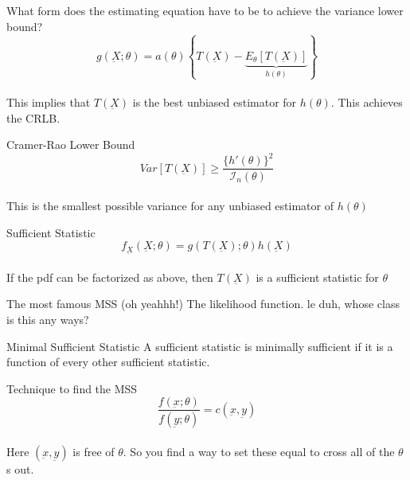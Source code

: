 \documentclass[avery5388,grid,frame]{flashcards}
\begin{document}
\begin{flashcard}[Definition]{What form does the estimating equation have to be to achieve the variance lower bound?}
\bigskip\bigskip\bigskip
\begin{equation*}
g(\underbar{X};\theta)=a(\theta)\left\{T(\underbar{X})-\underbrace{E_\theta[T(\underbar{X})]}_{h(\theta)}\right\}
\end{equation*}
\bigskip\\
This implies that $T(\underbar{X})$ is the best unbiased estimator for $h(\theta)$. This achieves the CRLB.
\end{flashcard}
\begin{flashcard}[Definition]{Cramer-Rao Lower Bound}
\bigskip\bigskip\bigskip
\begin{equation*}
Var[T(\underbar{X})]\geq\frac{\{h'(\theta)\}^2}{\mathcal{I}_n(\theta)}
\end{equation*}
\bigskip\\
This is the smallest possible variance for any unbiased estimator of $h(\theta)$
\end{flashcard}
\begin{flashcard}[Definition]{Sufficient Statistic}
\bigskip\bigskip\bigskip
\begin{equation*}
f_{\underbar{X}}(\underbar{X};\theta)=g(T(\underbar{X});\theta)h(\underbar{X})
\end{equation*}
\bigskip\\
If the pdf can be factorized as above, then $T(\underbar{X})$ is a sufficient statistic for $\theta$
\end{flashcard}
\begin{flashcard}{The most famous MSS (oh yeahhh!)}
\bigskip\bigskip\bigskip
The likelihood function. le duh, whose class is this any ways?
\end{flashcard}
\begin{flashcard}[Definition]{Minimal Sufficient Statistic}
\bigskip\bigskip\bigskip
A sufficient statistic is minimally sufficient if it is a function of every other sufficient statistic.
\end{flashcard}
\begin{flashcard}{Technique to find the MSS}
\bigskip\bigskip\bigskip
\begin{equation*}
\frac{f(\underbar{x};\theta)}{f(\underbar{y};\theta)}=c(\underbar{x},\underbar{y})
\end{equation*}
\bigskip\\
Here $(\underbar{x},\underbar{y})$ is free of $\theta$. So you find a way to set these equal to cross all of the $\theta$s out.
\end{flashcard}
\end{document}
